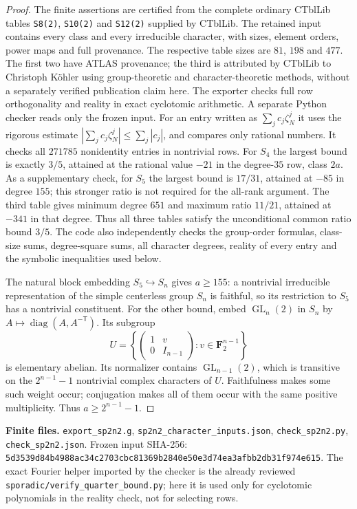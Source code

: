 \begin{proof}
The finite assertions are certified from the complete ordinary CTblLib
tables \texttt{S8(2)}, \texttt{S10(2)} and \texttt{S12(2)} supplied by CTblLib. The retained
input contains every class and every irreducible character, with sizes, element
orders, power maps and full provenance. The respective table sizes are $81$, $198$ and $477$. The first two have ATLAS provenance; the third is attributed
by CTblLib to Christoph K\"ohler using group-theoretic and
character-theoretic methods, without a separately verified publication
claim here. The exporter checks full row orthogonality and reality in exact
cyclotomic arithmetic. A separate Python checker reads only the frozen input.
For an entry written as $\sum_j c_j\zeta_N^j$ it uses the rigorous estimate
$|\sum_j c_j\zeta_N^j|\le\sum_j|c_j|$, and compares only rational numbers.
It checks all $271785$ nonidentity entries in nontrivial rows. For $S_4$ the
largest bound is exactly $3/5$, attained at the rational value $-21$ in the
degree-$35$ row, class $2a$. As a supplementary check, for $S_5$ the largest
bound is $17/31$, attained at $-85$ in degree $155$; this stronger ratio is
not required for the all-rank argument. The third table gives minimum degree
$651$ and maximum ratio $11/21$, attained at $-341$ in that degree. Thus all
three tables satisfy the unconditional common ratio bound $3/5$. The code also independently checks
the group-order formulas, class-size sums, degree-square sums, all character
degrees, reality of every entry and the symbolic inequalities used below.

The natural block embedding $S_5\hookrightarrow S_n$ gives $a\ge155$:
a nontrivial irreducible representation of the simple centerless group
$S_n$ is faithful, so its restriction to $S_5$ has a nontrivial constituent.
For the other bound, embed $\operatorname{GL}_n(2)$ in $S_n$ by
$A\mapsto\operatorname{diag}(A,A^{-\mathsf T})$. Its subgroup
\[
 U=\left\{\begin{pmatrix}1&v\\0&I_{n-1}\end{pmatrix}:
                  v\in\mathbf F_2^{n-1}\right\}
\]
is elementary abelian. Its normalizer contains $\operatorname{GL}_{n-1}(2)$,
which is transitive on the $2^{n-1}-1$ nontrivial complex characters of $U$.
Faithfulness makes some such weight occur; conjugation makes all of them
occur with the same positive multiplicity. Thus $a\ge2^{n-1}-1$.
\end{proof}

\noindent\textbf{Finite files.}
\texttt{export\_sp2n2.g}, \texttt{sp2n2\_character\_inputs.json},
\texttt{check\_sp2n2.py}, \texttt{check\_sp2n2.json}.
Frozen input SHA-256:
\texttt{5d3539d84b4988ac34c2703cbc81369b2840e50e3d74ea3afbb2db31f974e615}.
The exact Fourier helper imported by the checker is the already reviewed
\texttt{sporadic/verify\_quarter\_bound.py}; here it is used only for
cyclotomic polynomials in the reality check, not for selecting rows.

